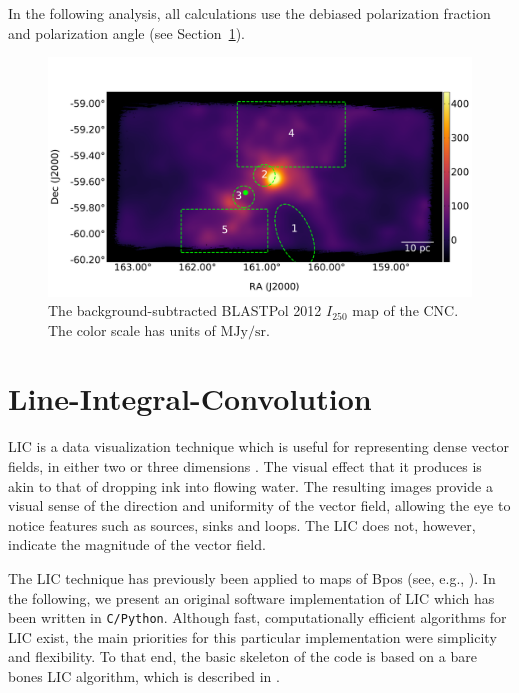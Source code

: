 In the following analysis, all calculations use the debiased polarization fraction and polarization angle (see Section~\ref{LIC}).

\begin{figure}[!htbp]
\centering
\includegraphics[width=\textwidth]{figures/carina/carina_I250}
\caption[The background-subtracted BLASTPol 2012  map of the CNC.]{The background-subtracted BLASTPol 2012 $I_{250}$ map of the CNC\@. The color scale has units of $\mathrm{MJy}/\mathrm{sr}$.}
\label{fig:I250}
\end{figure}

\section{Line-Integral-Convolution}\label{LIC}

LIC is a data visualization technique which is useful for representing dense vector fields, in either two or three dimensions \citep{cabral1993imaging}. The visual effect that it produces is akin to that of dropping ink into flowing water. The resulting images provide a visual sense of the direction and uniformity of the vector field, allowing the eye to notice features such as sources, sinks and loops. The LIC does not, however, indicate the magnitude of the vector field.

The LIC technique has previously been applied to maps of \gls{Bpos} (see, e.g., \citet{ade2016planck}). In the following, we present an original software implementation of LIC which has been written in \texttt{C/Python}. Although fast, computationally efficient algorithms for LIC exist, the main priorities for this particular implementation were simplicity and flexibility. To that end, the basic skeleton of the code is based on a bare bones LIC algorithm, which is described in \citet{ma1996texture}.

